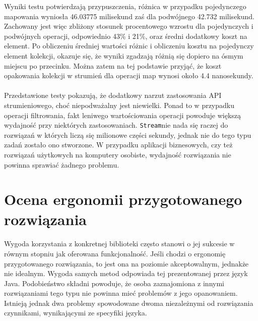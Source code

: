 \documentclass[a4paper,10pt]{report}
\begin{document}
Wyniki testu potwierdzają przypuszczenia, różnica w przypadku pojedynczego mapowania wyniosła 46.03775 milisekund zaś dla podwójnego 42.732 milisekund. Zachowany jest więc zbliżony stosunek procentowego wzrostu dla pojedynczych i podwójnych operacji, odpowiednio 43\% i 21\%, oraz średni dodatkowy koszt na element. Po obliczeniu średniej wartości różnic i obliczeniu kosztu na pojedynczy element kolekcji, okazuje się, że wyniki zgadzają  różnią się dopiero na ósmym miejscu po przecinku. Można zatem na tej podstawie przyjąć, że koszt opakowania kolekcji w strumień dla operacji map wynosi około 4.4 nanosekundy.
\paragraph{}
Przedstawione testy pokazują, że dodatkowy narzut zastosowania API strumieniowego, choć niepodważalny jest niewielki. Ponad to w przypadku operacji filtrowania, fakt leniwego wartościowania operacji powoduje większą wydajność przy niektórych zastosowaniach. \verb|Stream|nie nada się raczej do rozwiązań w których liczą się milionowe części sekundy, jednak nie do tego typu zadań zostało ono stworzone. W przypadku aplikacji biznesowych, czy też rozwiązań użytkowych na komputery osobiste, wydajność rozwiązania nie powinna sprawiać żadnego problemu.
\section{Ocena ergonomii przygotowanego rozwiązania}
\paragraph{}
Wygoda korzystania z konkretnej biblioteki często stanowi o jej sukcesie w równym stopniu jak oferowana funkcjonalność. Jeśli chodzi o ergonomię przygotowanego rozwiązania, to jest ona na poziomie akceptowalnym, jednakże nie idealnym. Wygoda samych metod odpowiada tej prezentowanej przez język Java. Podobieństwo składni powoduje, że osoba zaznajomiona z innymi rozwiązaniami tego typu nie powinna mieć problemów z jego opanowaniem. Istnieją jednak dwa problemy spowodowane dwoma niezależnymi od rozwiązania czynnikami, wynikającymi ze specyfiki języka.
\end{document}
